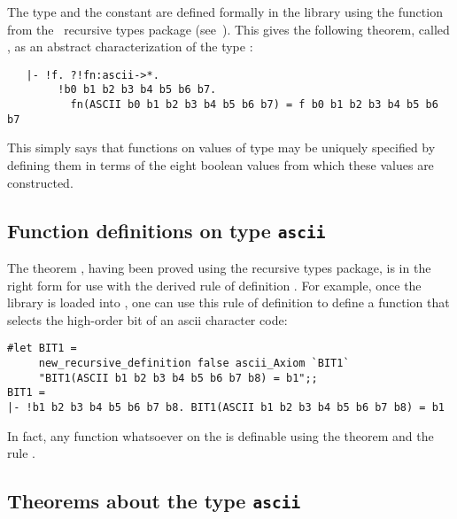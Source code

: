 The type  and the constant  are defined formally in the
library using the function  from the \HOL\ recursive types
package (see~\cite{description,melham}).  This gives the following theorem,
called , as an
abstract characterization of the type :

\begin{hol}
\begin{verbatim}
   |- !f. ?!fn:ascii->*.
        !b0 b1 b2 b3 b4 b5 b6 b7.
          fn(ASCII b0 b1 b2 b3 b4 b5 b6 b7) = f b0 b1 b2 b3 b4 b5 b6 b7
\end{verbatim}\end{hol}

\noindent This simply says that functions on values of type  may be
uniquely specified by defining them in terms of the eight boolean values from
which these values are constructed.

\subsection{Function definitions on type {\tt ascii}}%

The theorem , having been proved using the recursive types
package, is in the right form for use with the derived rule of definition
.  For example, once the  library is
loaded into \HOL, one can use this rule of definition to define a function that
selects the high-order bit of an ascii character code:

\setcounter{sessioncount}{1}
\begin{session}\begin{verbatim}
#let BIT1 =
     new_recursive_definition false ascii_Axiom `BIT1`
     "BIT1(ASCII b1 b2 b3 b4 b5 b6 b7 b8) = b1";;
BIT1 =
|- !b1 b2 b3 b4 b5 b6 b7 b8. BIT1(ASCII b1 b2 b3 b4 b5 b6 b7 b8) = b1
\end{verbatim}\end{session}

\noindent In fact, any function whatsoever on the  is definable
using the theorem  and the rule
.  

\subsection{Theorems about the type {\tt ascii}}%

